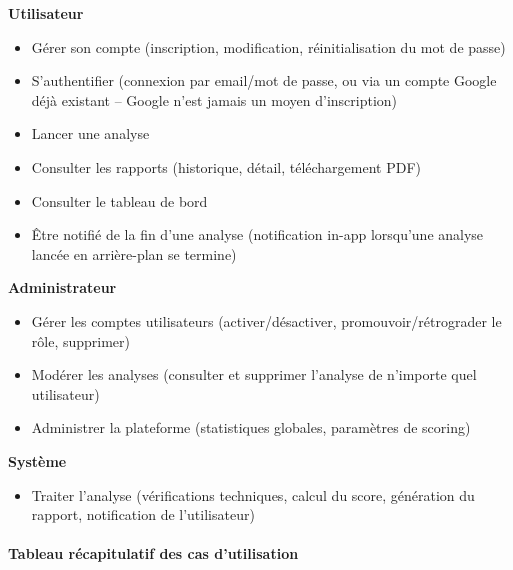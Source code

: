 \textbf{Utilisateur}
\begin{itemize}[nosep]
  \item G\'erer son compte (inscription, modification, r\'einitialisation du mot de passe)
  \item S'authentifier (connexion par email/mot de passe, ou via un compte Google d\'ej\`a existant -- Google n'est jamais un moyen d'inscription)
  \item Lancer une analyse
  \item Consulter les rapports (historique, d\'etail, t\'el\'echargement PDF)
  \item Consulter le tableau de bord
  \item \^Etre notifi\'e de la fin d'une analyse (notification in-app lorsqu'une analyse lanc\'ee en arri\`ere-plan se termine)
\end{itemize}
\textbf{Administrateur}
\begin{itemize}[nosep]
  \item G\'erer les comptes utilisateurs (activer/d\'esactiver, promouvoir/r\'etrograder le r\^ole, supprimer)
  \item Mod\'erer les analyses (consulter et supprimer l'analyse de n'importe quel utilisateur)
  \item Administrer la plateforme (statistiques globales, param\`etres de scoring)
\end{itemize}
\textbf{Syst\`eme}
\begin{itemize}[nosep]
  \item Traiter l'analyse (v\'erifications techniques, calcul du score, g\'en\'eration du rapport, notification de l'utilisateur)
\end{itemize}

\paragraph{Tableau r\'ecapitulatif des cas d'utilisation}

